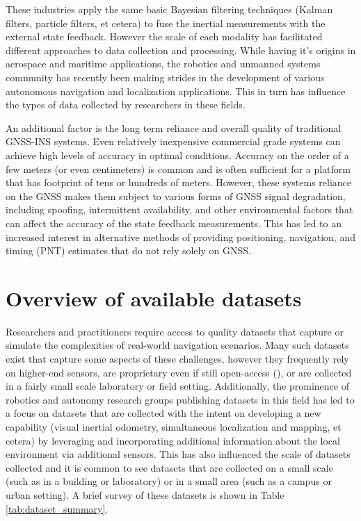 \documentclass[sageh,times]{sagej}
\begin{document}
These industries apply the same basic Bayesian filtering techniques (Kalman filters, particle filters, et cetera) to fuse the inertial measurements with the external state feedback. However the scale of each modality has facilitated different approaches to data collection and processing. While having it's origins in aerospace and maritime applications, the robotics and unmanned systems community has recently been making strides in the development of various autonomous navigation and localization applications. This in turn has influence the types of data collected by researchers in these fields.

An additional factor is the long term reliance and overall quality of traditional GNSS-INS systems. Even relatively inexpensive commercial grade systems can achieve high levels of accuracy in optimal conditions. Accuracy on the order of a few meters (or even centimeters) is common and is often sufficient for a platform that has footprint of tens or hundreds of meters. However, these systems reliance on the GNSS makes them subject to various forms of GNSS signal degradation, including spoofing, intermittent availability, and other environmental factors that can affect the accuracy of the state feedback measurements. This has led to an increased interest in alternative methods of providing positioning, navigation, and timing (PNT) estimates that do not rely solely on GNSS.

\section{Overview of available datasets}
Researchers and practitioners require access to quality datasets that capture or simulate the complexities of real-world navigation scenarios. Many such datasets exist that capture some aspects of these challenges, however they frequently rely on higher-end sensors, are proprietary even if still open-access (\cite{waymo}), or are collected in a fairly small scale laboratory or field setting. Additionally, the prominence of robotics and autonomy research groups publishing datasets in this field has led to a focus on datasets that are collected with the intent on developing a new capability (visual inertial odometry, simultaneous localization and mapping, et cetera) by leveraging and incorporating additional information about the local environment via additional sensors. This has also influenced the scale of datasets collected and it is common to see datasets that are collected on a small scale (such as in a building or laboratory) or in a small area (such as a campus or urban setting). A brief survey of these datasets is shown in Table \ref{tab:dataset_summary}.
\end{document}
